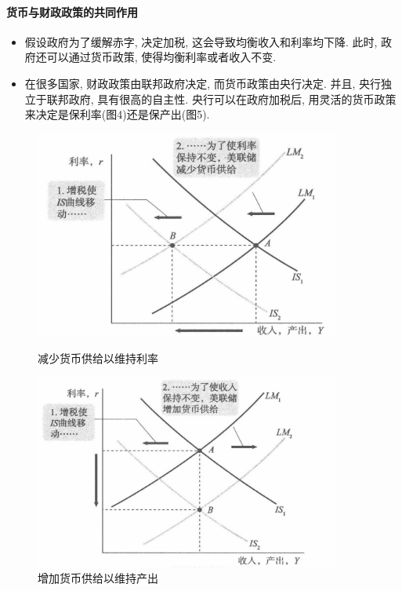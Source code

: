 \documentclass[]{ctexart}
\begin{document}
\newpage

\paragraph{货币与财政政策的共同作用}

\begin{itemize}
  \item 假设政府为了缓解赤字,  决定加税,  这会导致均衡收入和利率均下降. 此时,  政府还可以通过货币政策,  使得均衡利率或者收入不变. 

  \item 在很多国家,  财政政策由联邦政府决定,  而货币政策由央行决定. 并且, 央行独立于联邦政府, 具有很高的自主性.  央行可以在政府加税后,  用灵活的货币政策来决定是保利率(图4)还是保产出(图5). 
\end{itemize}

\begin{figure}
\centering
\begin{minipage}{.48\textwidth}
\includegraphics[width=0.9\textwidth]{fig2/is-lm1.jpg}
\caption{减少货币供给以维持利率}

\end{minipage}%
\begin{minipage}{.5\textwidth}

\includegraphics[width=0.9\textwidth]{fig2/is-lm2.jpeg}
\caption{增加货币供给以维持产出}


\end{minipage}
\end{figure}
\end{document}
